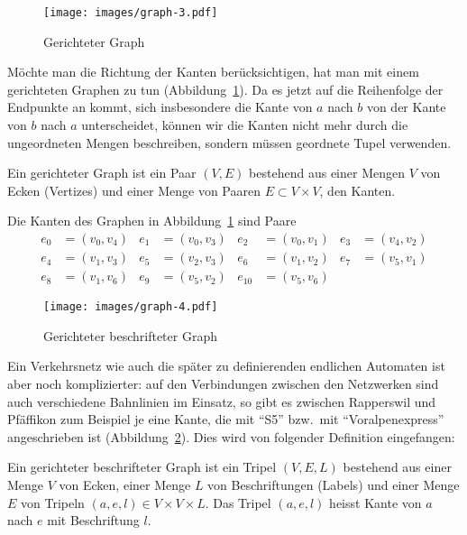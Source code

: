 \begin{figure}
\begin{center}
\texttt{[image: images/graph-3.pdf]}
\end{center}
\caption{Gerichteter Graph\label{grundlagen:gerichtetergraph}}
\end{figure}
Möchte man die Richtung der Kanten berücksichtigen,
hat man mit einem gerichteten
Graphen zu tun (Abbildung~\ref{grundlagen:gerichtetergraph}).
Da es jetzt auf die Reihenfolge der Endpunkte an kommt,
sich insbesondere die Kante von $a$ nach $b$ von der Kante von $b$ nach
$a$ unterscheidet, können wir die Kanten nicht mehr durch die ungeordneten
Mengen beschreiben, sondern müssen geordnete Tupel verwenden.

\begin{definition}
%
\label{def_gerichteter_graph}
Ein gerichteter Graph ist ein Paar $(V,E)$ bestehend aus einer
Mengen $V$ von Ecken (Vertizes) und einer Menge von Paaren $E\subset V\times V$,
den Kanten.
\end{definition}

Die Kanten des Graphen in Abbildung~\ref{grundlagen:gerichtetergraph}
sind Paare
\begin{align*}
e_0&=(v_0,v_4)
&
e_1&=(v_0,v_3)
&
e_2&=(v_0,v_1)
&
e_3&=(v_4,v_2)
\\
e_4&=(v_1,v_3)
&
e_5&=(v_2,v_3)
&
e_6&=(v_1,v_2)
&
e_7&=(v_5,v_1)
\\
e_8&=(v_1,v_6)
&
e_9&=(v_5,v_2)
&
e_{10}&=(v_5,v_6)
\end{align*}

\begin{figure}
\begin{center}
\texttt{[image: images/graph-4.pdf]}
\end{center}
\caption{Gerichteter beschrifteter Graph\label{grundlagen:beschrgraph}}
\end{figure}
Ein Verkehrsnetz wie auch die später zu definierenden endlichen
Automaten ist aber noch komplizierter: auf den Verbindungen zwischen
den Netzwerken sind auch verschiedene Bahnlinien im Einsatz, so gibt
es zwischen Rapperswil und Pfäffikon zum Beispiel je eine Kante, die
mit ``S5'' bzw.~mit ``Voralpenexpress'' angeschrieben ist
(Abbildung~\ref{grundlagen:beschrgraph}).
Dies wird von folgender Definition eingefangen:

\begin{definition}
\label{def_gerichteter_beschrifteter_graph}
%
Ein gerichteter beschrifteter Graph ist ein Tripel $(V,E,L)$ bestehend
aus einer Menge $V$ von Ecken, einer Menge $L$ von Beschriftungen (Labels) und 
einer Menge $E$ von Tripeln $(a,e,l)\in V\times V\times L$.
Das Tripel $(a,e,l)$ heisst Kante von $a$ nach $e$ mit Beschriftung $l$.
\end{definition}

